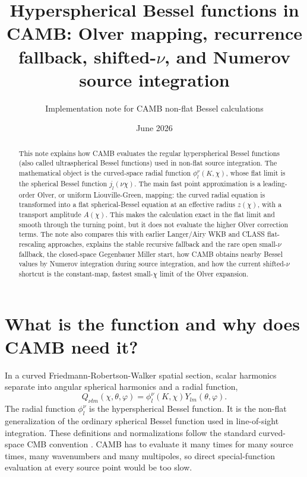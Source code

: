 \documentclass[11pt,a4paper]{article}
\title{Hyperspherical Bessel functions in CAMB: Olver mapping, recurrence fallback, shifted-\(\nu\), and Numerov source integration}
\author{Implementation note for CAMB non-flat Bessel calculations}
\date{June 2026}
\newcommand{\code}[1]{\texttt{\detokenize{#1}}}
\begin{document}
\sloppy
\maketitle

\begin{abstract}
This note explains how CAMB evaluates the regular hyperspherical Bessel functions (also called ultraspherical Bessel functions) used in non-flat source integration.  The mathematical object is the curved-space radial function \(\phi_l^\nu(K,\chi)\), whose flat limit is the spherical Bessel function \(j_l(\nu\chi)\).  The main fast point approximation is a leading-order Olver, or uniform Liouville-Green, mapping: the curved radial equation is transformed into a flat spherical-Bessel equation at an effective radius \(z(\chi)\), with a transport amplitude \(A(\chi)\).  This makes the calculation exact in the flat limit and smooth through the turning point, but it does not evaluate the higher Olver correction terms.  The note also compares this with earlier Langer/Airy WKB and \textsc{CLASS} flat-rescaling approaches, explains the stable recursive fallback \code{phi_recurs} and the rare open small-\(\nu\) fallback, the closed-space Gegenbauer Miller start, how CAMB obtains nearby Bessel values by Numerov integration during source integration, and how the current shifted-\(\nu\) shortcut is the constant-map, fastest small-\(\chi\) limit of the Olver expansion.
\end{abstract}

\tableofcontents

\section{What is the function and why does CAMB need it?}

In a curved Friedmann-Robertson-Walker spatial section, scalar harmonics separate into angular spherical harmonics and a radial function,
\begin{equation}
  Q_{\nu lm}(\chi,\theta,\varphi)=\phi_l^\nu(K,\chi)Y_{lm}(\theta,\varphi).
\end{equation}
The radial function \(\phi_l^\nu\) is the hyperspherical Bessel function.  It is the non-flat generalization of the ordinary spherical Bessel function used in line-of-sight integration.  These definitions and normalizations follow the standard curved-space CMB convention \cite{abbott-schaefer,kosowsky1998,tram2013,lesgourgues-tram2013}.  CAMB has to evaluate it many times for many source times, many wavenumbers and many multipoles, so direct special-function evaluation at every source point would be too slow.
\end{document}
